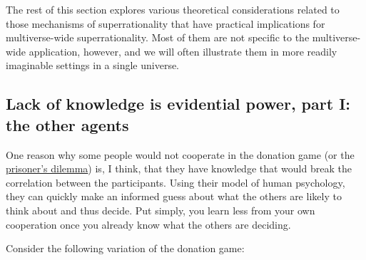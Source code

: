 The rest of this section explores various theoretical considerations
related to those mechanisms of superrationality that have practical
implications for multiverse-wide superrationality. Most of them are not
specific to the multiverse-wide application, however, and we will often
illustrate them in more readily imaginable settings in a single
universe.

\hypertarget{lack-of-knowledge-is-evidential-power-part-i-the-other-agents}{\subsection{Lack
of knowledge is evidential power, part I: the other
agents}\label{lack-of-knowledge-is-evidential-power-part-i-the-other-agents}}

One reason why some people would not cooperate in the donation game (or
the
\href{https://en.wikipedia.org/wiki/Prisoner\%27s_dilemma}{prisoner's
dilemma}) is, I think, that they have knowledge that would break the
correlation between the participants. Using their model of human
psychology, they can quickly make an informed guess about what the
others are likely to think about and thus decide. Put simply, you learn
less from your own cooperation once you already know what the others are
deciding.

Consider the following variation of the donation game:

